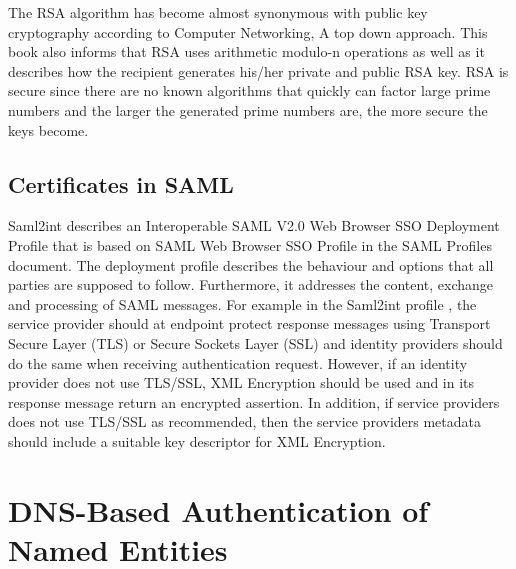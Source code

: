 The RSA algorithm has become almost synonymous with public key cryptography according to Computer Networking, A top down approach\cite[p.~726]{book:computer-networking}.
This book also informs that RSA uses arithmetic modulo-n operations as well as it describes how the recipient generates his/her private and public RSA key.
RSA is secure since there are no known algorithms that quickly can factor large prime numbers and the larger the generated prime numbers are, the more secure the keys become.

\subsection{Certificates in SAML}

Saml2int \cite{website:saml2int} describes an Interoperable SAML V2.0 Web Browser SSO Deployment Profile that is based on 
SAML Web Browser SSO Profile in the SAML Profiles document\cite{pdf:oasis-open-profiles}. 
The deployment profile describes the behaviour and options that all parties are supposed to follow. 
Furthermore, it addresses the content, exchange and processing of SAML messages.
For example in the Saml2int profile \cite{website:saml2int}, the service provider should at endpoint protect response 
messages using Transport Secure Layer (TLS) or Secure Sockets Layer (SSL)  and identity providers should do the same when receiving 
authentication request. 
However, if an identity provider does not use TLS/SSL, XML Encryption should be used and in its response message return an encrypted assertion. 
In addition, if service providers does not use TLS/SSL as recommended, then the service providers metadata should include a suitable key descriptor for XML Encryption.


\section{DNS-Based Authentication of Named Entities} 
